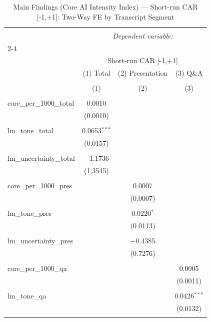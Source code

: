 
\begin{table}[!htbp] \centering 
  \caption{Main Findings (Core AI Intensity Index) — Short-run CAR [-1,+1]: Two-Way FE by Transcript Segment} 
  \label{} 
\begin{tabular}{@{\extracolsep{5pt}}lccc} 
\\[-1.8ex]\hline 
\hline \\[-1.8ex] 
 & \multicolumn{3}{c}{\textit{Dependent variable:}} \\ 
\cline{2-4} 
\\[-1.8ex] & \multicolumn{3}{c}{Short-run CAR [-1,+1]} \\ 
 & (1) Total & (2) Presentation & (3) Q\&A \\ 
\\[-1.8ex] & (1) & (2) & (3)\\ 
\hline \\[-1.8ex] 
 core\_per\_1000\_total & 0.0010 &  &  \\ 
  & (0.0010) &  &  \\ 
  & & & \\ 
 lm\_tone\_total & 0.0653$^{***}$ &  &  \\ 
  & (0.0157) &  &  \\ 
  & & & \\ 
 lm\_uncertainty\_total & $-$1.1736 &  &  \\ 
  & (1.3545) &  &  \\ 
  & & & \\ 
 core\_per\_1000\_pres &  & 0.0007 &  \\ 
  &  & (0.0007) &  \\ 
  & & & \\ 
 lm\_tone\_pres &  & 0.0220$^{*}$ &  \\ 
  &  & (0.0113) &  \\ 
  & & & \\ 
 lm\_uncertainty\_pres &  & $-$0.4385 &  \\ 
  &  & (0.7276) &  \\ 
  & & & \\ 
 core\_per\_1000\_qa &  &  & 0.0005 \\ 
  &  &  & (0.0011) \\ 
  & & & \\ 
 lm\_tone\_qa &  &  & 0.0426$^{***}$ \\ 
  &  &  & (0.0132) \\ 
  & & & \\ 

\end{tabular}
\end{table}
